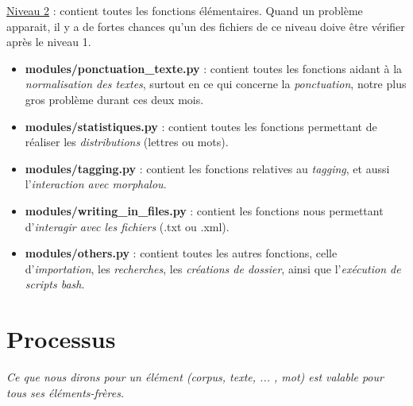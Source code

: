 \underline{Niveau 2} : contient toutes les fonctions élémentaires. Quand un problème apparait, il y a de fortes chances qu'un des fichiers de ce niveau doive être vérifier après le niveau 1.
	\begin{itemize}
	\item \textbf{modules/ponctuation\_texte.py} : contient toutes les fonctions aidant à la \emph{normalisation des textes}, surtout en ce qui concerne la \emph{ponctuation}, notre plus gros problème durant ces deux mois.
	
	\item \textbf{modules/statistiques.py} : contient toutes les fonctions permettant de réaliser les \emph{distributions} (lettres ou mots).

	\item \textbf{modules/tagging.py} : contient les fonctions relatives au \emph{tagging}, et aussi l'\emph{interaction avec morphalou}.
			
	\item \textbf{modules/writing\_in\_files.py} : contient les fonctions nous permettant d'\emph{interagir avec les fichiers} (.txt ou .xml).

	\item \textbf{modules/others.py} : contient toutes les autres fonctions, celle d'\emph{importation}, les \emph{recherches}, les \emph{créations de dossier}, ainsi que l'\emph{exécution de scripts bash}. \\
	 
	\end{itemize}

\newpage
\section{Processus}

\emph{Ce que nous dirons pour un élément (corpus, texte, ... , mot) est valable pour tous ses éléments-frères.} 


